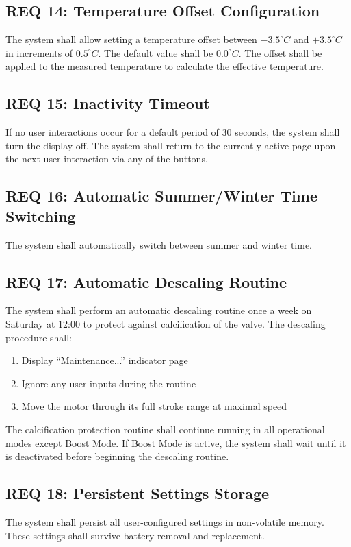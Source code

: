 \subsection*{REQ 14: Temperature Offset Configuration}
\label{subsec:REQ 14: Temperature Offset Configuration}
The system shall allow setting a temperature offset between $-3.5^\circ C$ and $+3.5^\circ C$ in increments of $0.5^\circ C$. The default value shall be $0.0^\circ C$. The offset shall be applied to the measured temperature to calculate the effective temperature.

\subsection*{REQ 15: Inactivity Timeout}
\label{subsec:REQ 15: Inactivity Timeout}
If no user interactions occur for a default period of $30$ seconds, the system shall turn the display off. The system shall return to the currently active page upon the next user interaction via any of the buttons.

\subsection*{REQ 16: Automatic Summer/Winter Time Switching}
\label{subsec:REQ 16: Automatic Summer/Winter Time Switching}
The system shall automatically switch between summer and winter time.

\subsection*{REQ 17: Automatic Descaling Routine}
\label{subsec:REQ 17: Automatic Descaling Routine}
The system shall perform an automatic descaling routine once a week on Saturday at 12:00 to protect against calcification of the valve. The descaling procedure shall:
\begin{enumerate}
    \item Display ``Maintenance...'' indicator page
    \item Ignore any user inputs during the routine
    \item Move the motor through its full stroke range at maximal speed
\end{enumerate}
The calcification protection routine shall continue running in all operational modes except Boost Mode. If Boost Mode is active, the system shall wait until it is deactivated before beginning the descaling routine.

\subsection*{REQ 18: Persistent Settings Storage}
\label{subsec:REQ 18: Persistent Settings Storage}
The system shall persist all user-configured settings in non-volatile memory. These settings shall survive battery removal and replacement.

